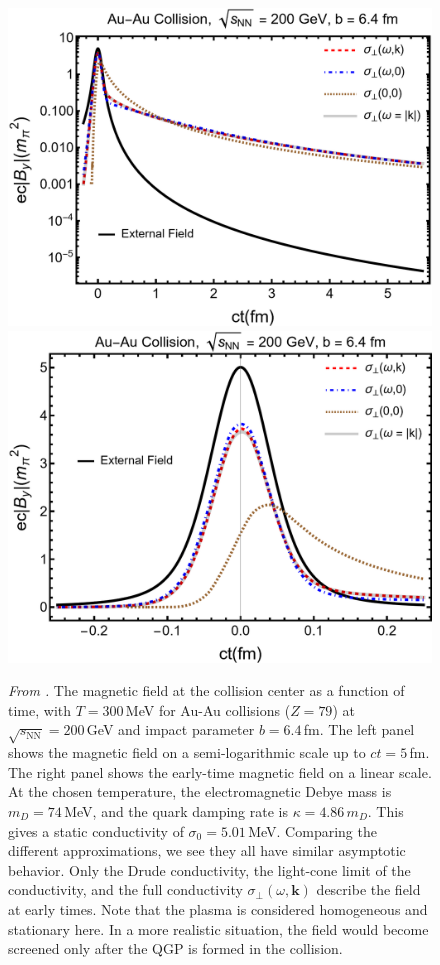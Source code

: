 \phantom{Phantom text}
\begin{figure}[ht]
\centering              
\includegraphics[width=0.46\linewidth]{plots/chap02QCD/bf100.png}
\hspace{0.05\linewidth}
\includegraphics[width=0.44\linewidth]{plots/chap02QCD/bf100lin.png}
\caption{\textit{From \cite{Grayson:2022asf}.} The magnetic field at the collision center as a function of time, with $T = 300$\,MeV for Au-Au collisions ($Z=79$) at $\sqrt{s_\text{NN}} = 200$\,GeV and impact parameter $b = 6.4\,$fm. The left panel shows the magnetic field on a semi-logarithmic scale up to $ct = 5$\,fm. The right panel shows the early-time magnetic field on a linear scale. At the chosen temperature, the electromagnetic Debye mass is $m_D = 74\,$MeV, and the quark damping rate is $\kappa = 4.86\,m_D$. This gives a static conductivity of $\sigma_0 = 5.01\,$MeV. Comparing the different approximations, we see they all have similar asymptotic behavior. Only the Drude conductivity, the light-cone limit of the conductivity, and the full conductivity $\sigma_\perp(\omega,\boldsymbol{k})$ describe the field at early times. Note that the plasma is considered homogeneous and stationary here. In a more realistic situation, the field would become screened only after the QGP is formed in the collision.\label{fig:bfcomp}}
\end{figure}

